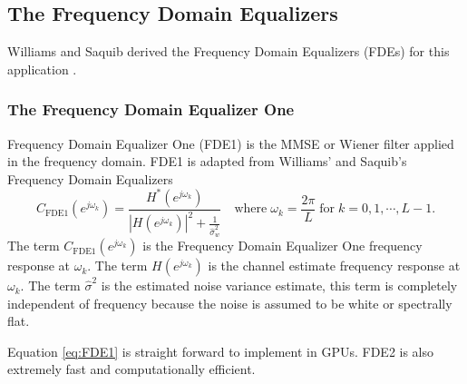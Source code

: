 \clearpage
\subsection{The Frequency Domain Equalizers}
Williams and Saquib derived the Frequency Domain Equalizers (FDEs) for this application \cite[]{williams2013linear}.

\subsubsection{The Frequency Domain Equalizer One}
Frequency Domain Equalizer One (FDE1) is the MMSE or Wiener filter applied in the frequency domain.
FDE1 is adapted from Williams' and Saquib's Frequency Domain Equalizers \cite[eq. (11)]{williams2013linear}
\begin{equation}
C_\text{FDE1}(e^{j\omega_k}) = \frac{H^\ast(e^{j\omega_k})}  {|H(e^{j\omega_k})|^2  +  \frac{1}{\hat{\sigma}^2_w}} \quad
\text{where} \;
\omega_k = \frac{2\pi}{L} \;
\text{for} \;
k=0,1,\cdots,L-1.
\label{eq:FDE1}
\end{equation}
The term $C_\text{FDE1}(e^{j\omega_k})$ is the Frequency Domain Equalizer One frequency response at $\omega_k$.
The term $H(e^{j\omega_k})$ is the channel estimate frequency response at $\omega_k$.
The term $\hat{\sigma}^2$ is the estimated noise variance estimate, this term is completely independent of frequency because the noise is assumed to be white or spectrally flat.

Equation \eqref{eq:FDE1} is straight forward to implement in GPUs.
FDE2 is also extremely fast and computationally efficient.


